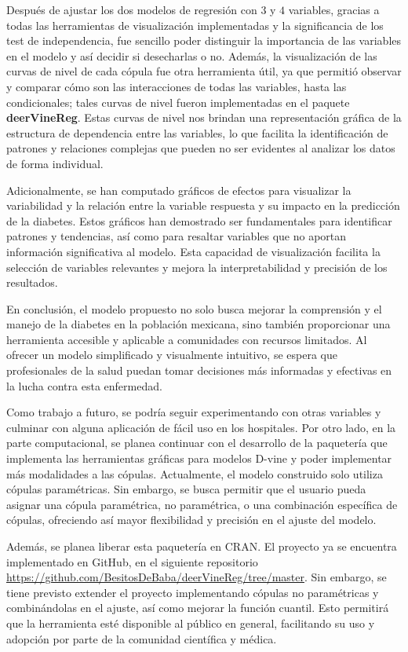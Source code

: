 Después de ajustar los dos modelos de regresión con $3$ y $4$ variables, gracias a todas las herramientas de visualización implementadas y la significancia de los test de independencia, fue sencillo poder distinguir la importancia de las variables en el modelo y así decidir si desecharlas o no. Además, la visualización de las curvas de nivel de cada cópula fue otra herramienta útil, ya que permitió observar y comparar cómo son las interacciones de todas las variables, hasta las condicionales; tales curvas de nivel fueron implementadas en el paquete \textbf{deerVineReg}. Estas curvas de nivel nos brindan una representación gráfica de la estructura de dependencia entre las variables, lo que facilita la identificación de patrones y relaciones complejas que pueden no ser evidentes al analizar los datos de forma individual.

Adicionalmente, se han computado gráficos de efectos para visualizar la variabilidad y la relación entre la variable respuesta y su impacto en la predicción de la diabetes. Estos gráficos han demostrado ser fundamentales para identificar patrones y tendencias, así como para resaltar variables que no aportan información significativa al modelo. Esta capacidad de visualización facilita la selección de variables relevantes y mejora la interpretabilidad y precisión de los resultados.

En conclusión, el modelo propuesto no solo busca mejorar la comprensión y el manejo de la diabetes en la población mexicana, sino también proporcionar una herramienta accesible y aplicable a comunidades con recursos limitados. Al ofrecer un modelo simplificado y visualmente intuitivo, se espera que profesionales de la salud puedan tomar decisiones más informadas y efectivas en la lucha contra esta enfermedad.

Como trabajo a futuro, se podría seguir experimentando con otras variables y culminar con alguna aplicación de fácil uso en los hospitales. Por otro lado, en la parte computacional, se planea continuar con el desarrollo de la paquetería que implementa las herramientas gráficas para modelos D-vine y poder implementar más modalidades a las cópulas. Actualmente, el modelo construido solo utiliza cópulas paramétricas. Sin embargo, se busca permitir que el usuario pueda asignar una cópula paramétrica, no paramétrica, o una combinación específica de cópulas, ofreciendo así mayor flexibilidad y precisión en el ajuste del modelo. 

Además, se planea liberar esta paquetería en CRAN. El proyecto ya se encuentra implementado en GitHub, en el siguiente repositorio \url{https://github.com/BesitosDeBaba/deerVineReg/tree/master}. Sin embargo, se tiene previsto extender el proyecto implementando cópulas no paramétricas y combinándolas en el ajuste, así como mejorar la función cuantil. Esto permitirá que la herramienta esté disponible al público en general, facilitando su uso y adopción por parte de la comunidad científica y médica.